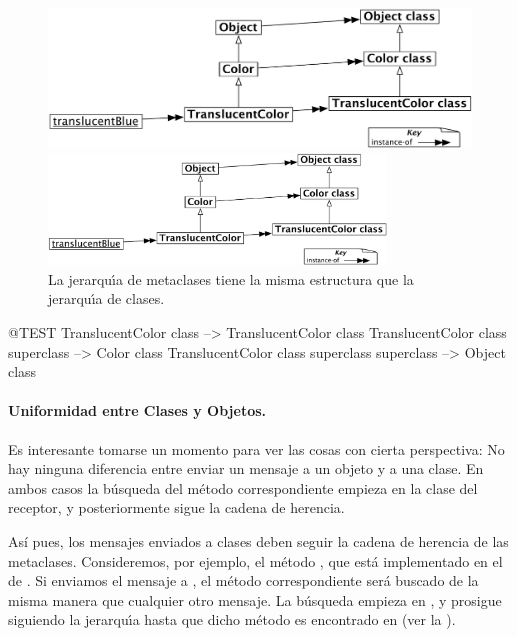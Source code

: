 \documentclass[a4paper,10pt,twoside]{book}
\begin{document}
\begin{center}
\begin{figure}[!ht]
\ifluluelse
	{\centerline {\includegraphics[width=\textwidth]{TranslucentMetaclassHierarchy}}}
	{\centerline {\includegraphics[width=0.8\textwidth]{TranslucentMetaclassHierarchy}}}
\caption{La jerarqu\'{\i}a de metaclases tiene la misma estructura que la jerarqu\'{\i}a de clases.}
\end{figure}
\end{center}

\begin{code}{@TEST}
TranslucentColor class                                     --> TranslucentColor class
TranslucentColor class superclass                   --> Color class
TranslucentColor class superclass superclass --> Object class
\end{code}

\paragraph{Uniformidad entre Clases y Objetos.}
Es interesante tomarse un momento para ver las cosas con cierta perspectiva: No hay ninguna diferencia entre enviar un mensaje a un objeto y a una clase. En ambos casos la b\'usqueda del m\'etodo correspondiente empieza en la clase del receptor, y posteriormente sigue la cadena de herencia.

Así pues, los mensajes enviados a clases deben seguir la cadena de herencia de las metaclases. Consideremos, por ejemplo, el m\'etodo , que est\'a implementado en el  de . Si enviamos el mensaje  a , el m\'etodo correspondiente ser\'a buscado de la misma manera que cualquier otro mensaje. La b\'usqueda empieza en , y prosigue siguiendo la jerarqu\'{\i}a hasta que dicho m\'etodo es encontrado en  (ver la ).
\end{document}
